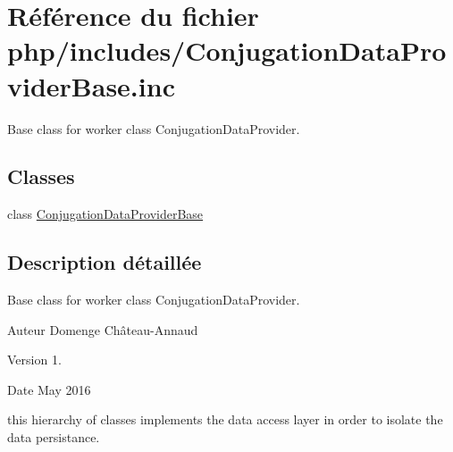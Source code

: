 \hypertarget{_conjugation_data_provider_base_8inc}{}\section{Référence du fichier php/includes/\+Conjugation\+Data\+Provider\+Base.inc}
\label{_conjugation_data_provider_base_8inc}


Base class for worker class Conjugation\+Data\+Provider.  


\subsection*{Classes}
\begin{DoxyCompactItemize}
\item 
class \hyperlink{class_conjugation_data_provider_base}{Conjugation\+Data\+Provider\+Base}
\end{DoxyCompactItemize}


\subsection{Description détaillée}
Base class for worker class Conjugation\+Data\+Provider. 

\begin{DoxyAuthor}{Auteur}
Domenge Château-\/\+Annaud 
\end{DoxyAuthor}
\begin{DoxyVersion}{Version}
1. 
\end{DoxyVersion}
\begin{DoxyDate}{Date}
May 2016
\end{DoxyDate}
this hierarchy of classes implements the data access layer in order to isolate the data persistance. 